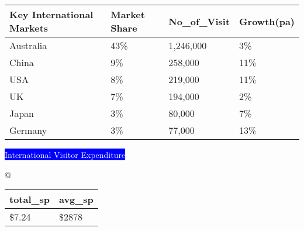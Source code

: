 

%

\begin{table}[ht]
\centering
\begin{tabular}{llll}
  \hline
Key International Markets & Market Share & No\_of\_Visit & Growth(pa) \\ 
  \hline
Australia & 43\% & 1,246,000 & 3\% \\ 
  China & 9\% &   258,000 & 11\% \\ 
  USA & 8\% &   219,000 & 11\% \\ 
  UK & 7\% &   194,000 & 2\% \\ 
  Japan & 3\% &    80,000 & 7\% \\ 
  Germany & 3\% &    77,000 & 13\% \\ 
   \hline
\end{tabular}
\end{table}


% 
{\colorbox{blue}{\textcolor{white}{\scriptsize International Visitor Expenditure}}}\par






@
\begin{table}[ht]
\centering
\begin{tabular}{ll}
  \hline
total\_sp & avg\_sp \\ 
  \hline
\$7.24 & \$2878 \\ 
   \hline
\end{tabular}
\end{table}


